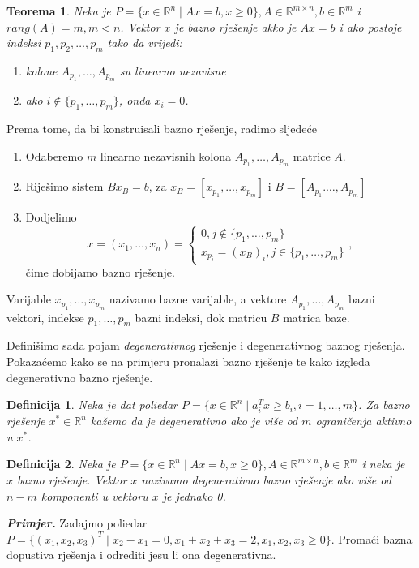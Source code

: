 \documentclass[a4paper, utf8, 11pt, colorlinks]{book}
\newtheorem{definition}{Definicija}
\newtheorem{thm}{Teorema}
\begin{document}
\begin{thm}
   Neka je $P = \{ x \in \mathbb{R}^n \mid A x = b, x \geq 0\}, A \in \mathbb{R}^{m \times n}, b \in \mathbb{R}^m$ i $rang(A)= m, m < n$.
   Vektor $x$ je bazno rješenje  akko je $A x = b$ i ako postoje indeksi $p_1,p_2,\ldots, p_m$ tako da vrijedi:
   \begin{enumerate}
       \item kolone $A_{p_1},\ldots, A_{p_m}$ su linearno nezavisne
       \item ako $i \notin \{p_1,\ldots, p_m\}$, onda $x_i = 0$.
   \end{enumerate}
   
\end{thm}
Prema tome, da bi  konstruisali bazno rješenje, radimo sljedeće
\begin{enumerate}
    \item Odaberemo $m$ linearno nezavisnih kolona $A_{p_1}, \ldots, A_{p_m}$ matrice $A$.
    \item Riješimo sistem $B x_B = b$, za $x_B = [x_{p_1}, \ldots, x_{p_m}]$ i $B= [A_{p_1}. \ldots, A_{p_m}]$
    \item Dodjelimo $$x = (x_1,\ldots, x_n)= \begin{cases}
    	          0, j  \not \in \{p_1,\ldots, p_m \} \\
    	         x_{p_i} = (x_B)_i, j \in \{ p_1,\ldots, p_m \}
    \end{cases},$$  čime dobijamo bazno rješenje. 
\end{enumerate}
Varijable $x_{p_1},\ldots, x_{p_m}$ nazivamo bazne varijable, a vektore  $A_{p_1}, \ldots, A_{p_m}$ bazni vektori, indekse $p_1,\ldots, p_m$ bazni indeksi, dok matricu $B$ matrica baze. 


Definišimo sada pojam \emph{degenerativnog} rješenje i degenerativnog baznog rješenja. Pokazaćemo kako se na primjeru pronalazi bazno rješenje te kako izgleda degenerativno bazno rješenje.

\begin{definition}
      Neka je dat poliedar $P = \{ x \in \mathbb{R}^n \mid a_i^T x \geq b_i, i=1,\ldots,m \}$. Za bazno rješenje $x^*\in \mathbb{R}^n$ kažemo da je degenerativno ako je više od $m$  ograničenja aktivno u $x^*$. 
      
\end{definition}

\begin{definition}
      Neka je $P = \{ x \in \mathbb{R}^n \mid A x = b, x \geq 0\}, A \in \mathbb{R}^{m \times n}, b \in \mathbb{R}^m$    i neka je $x$ bazno rješenje. Vektor $x$ nazivamo degenerativno bazno rješenje ako više od $n-m$ komponenti u vektoru $x$ je jednako 0.
\end{definition}
\emph{\textbf{Primjer.}} Zadajmo poliedar $P= \{ (x_1,x_2,x_3)^T \mid x_2 - x_1 = 0, x_1 + x_2 +   x_3 = 2, x_1,x_2,x_3 \geq 0 \}$.  Promaći bazna dopustiva rješenja i odrediti jesu li ona degenerativna. \\
\end{document}
